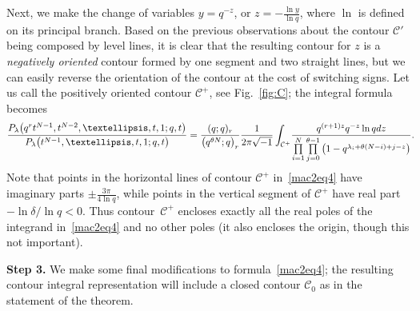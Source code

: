 \documentclass[11pt]{article}
\numberwithin{equation}{section}
\newcommand{\CC}{\mathcal{C}}
\begin{document}
Next, we make the change of variables $y = q^{-z}$, or $z = -\frac{\ln{y}}{\ln{q}}$, where $\ln$ is def\/ined on its principal branch. Based on the previous observations about the contour $\CC'$ being composed by level lines, it is clear that the resulting contour for $z$ is a \textit{negatively oriented} contour formed by one segment and two straight lines, but we can easily reverse the orientation of the contour at the cost of switching signs. Let us call the positively oriented contour $\CC^+$, see Fig.~\ref{fig:C}; the integral formula becomes
\begin{gather}\label{mac2eq4}
\frac{P_{\lambda}\big(q^rt^{N-1}, t^{N-2}, \dots, t, 1; q, t\big)}{P_{\lambda}\big(t^{N-1}, \dots, t, 1; q, t\big)} = \frac{(q; q)_r}{\big(q^{\theta N}; q\big)_r}\frac{1}{2\pi\sqrt{-1}}\int_{\CC^+}\!
{\frac{q^{(r+1)z} q^{-z}\ln{q} {\rm d}z}{\prod\limits_{i=1}^N{\prod\limits_{j=0}^{\theta-1}{\big(1 - q^{\lambda_i + \theta(N - i) + j- z}\big)}}}}.\!\!\!\!
\end{gather}
Note that points in the horizontal lines of contour $\CC^+$ in~\eqref{mac2eq4} have imaginary parts $\pm\frac{3\pi}{4\ln{q}}$, while points in the vertical segment of $\CC^+$ have real part $-\ln{\delta}/\ln{q} < 0$. Thus contour~$\CC^+$ encloses exactly all the real poles of the integrand in~\eqref{mac2eq4} and no other poles (it also encloses the origin, though this not important).

\textbf{Step 3.} We make some f\/inal modif\/ications to formula~\eqref{mac2eq4}; the resulting contour integral representation will include a closed contour $\CC_0$ as in the statement of the theorem.
\end{document}
